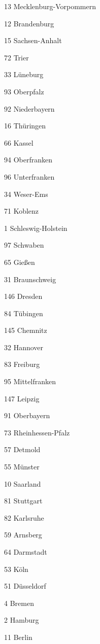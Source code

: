 13  Mecklenburg-Vorpommern

12  Brandenburg

15  Sachsen-Anhalt

72  Trier

33  Lüneburg

93  Oberpfalz

92  Niederbayern

16  Thüringen

66  Kassel

94  Oberfranken

96  Unterfranken

34  Weser-Ems

71  Koblenz

1  Schleswig-Holstein

97  Schwaben

65  Gießen

31  Braunschweig

146  Dresden

84  Tübingen

145  Chemnitz

32  Hannover

83  Freiburg

95  Mittelfranken

147  Leipzig

91  Oberbayern

73  Rheinhessen-Pfalz

57  Detmold

55  Münster

10  Saarland

81  Stuttgart

82  Karlsruhe

59  Arnsberg

64  Darmstadt

53  Köln

51  Düsseldorf

4  Bremen

2  Hamburg

11  Berlin

